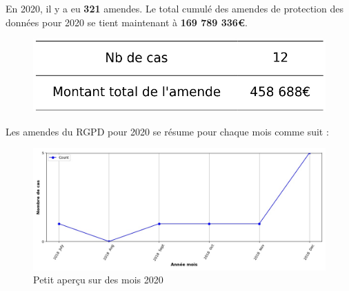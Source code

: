 \documentclass[french]{article}
\begin{document}
	\begin{multicols}{2}
	
	En 2020,  il y a eu \textbf{321} amendes.
	Le total cumulé des amendes de protection des données pour 2020 se tient maintenant à \textbf{169 789 336€}.
	
	\begin{figure}[H]
	\centering\includegraphics[width=1\linewidth]{graphs/counter_year}
	\end{figure}


	Les amendes du RGPD pour 2020 se résume pour chaque mois comme suit :

	\begin{figure}
	[H]\centering\includegraphics[width = 1.2\linewidth]{graphs/NbFinesPerMonth_year_graph}
	\caption{Petit aperçu sur des mois 2020}
	\end{figure}

	\end{multicols}
\end{document}
